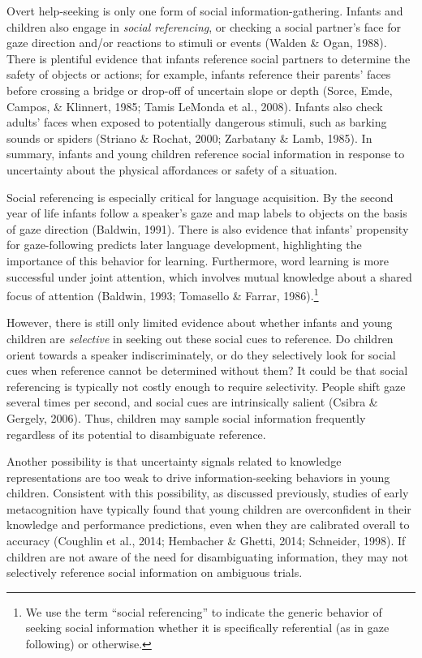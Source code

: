 \documentclass[a4paper,man,apacite,floatsintext]{apa6}
\begin{document}
Overt help-seeking is only one form of social information-gathering.
Infants and children also engage in \emph{social referencing}, or
checking a social partner's face for gaze direction and/or reactions to
stimuli or events (Walden \& Ogan, 1988). There is plentiful evidence
that infants reference social partners to determine the safety of
objects or actions; for example, infants reference their parents' faces
before crossing a bridge or drop-off of uncertain slope or depth (Sorce,
Emde, Campos, \& Klinnert, 1985; Tamis LeMonda et al., 2008). Infants
also check adults' faces when exposed to potentially dangerous stimuli,
such as barking sounds or spiders (Striano \& Rochat, 2000; Zarbatany \&
Lamb, 1985). In summary, infants and young children reference social
information in response to uncertainty about the physical affordances or
safety of a situation.

Social referencing is especially critical for language acquisition. By
the second year of life infants follow a speaker's gaze and map labels
to objects on the basis of gaze direction (Baldwin, 1991). There is also
evidence that infants' propensity for gaze-following predicts later
language development, highlighting the importance of this behavior for
learning. Furthermore, word learning is more successful under joint
attention, which involves mutual knowledge about a shared focus of
attention (Baldwin, 1993; Tomasello \& Farrar, 1986).\footnote{We use
  the term ``social referencing'' to indicate the generic behavior of
  seeking social information whether it is specifically referential (as
  in gaze following) or otherwise.}

However, there is still only limited evidence about whether infants and
young children are \emph{selective} in seeking out these social cues to
reference. Do children orient towards a speaker indiscriminately, or do
they selectively look for social cues when reference cannot be
determined without them? It could be that social referencing is
typically not costly enough to require selectivity. People shift gaze
several times per second, and social cues are intrinsically salient
(Csibra \& Gergely, 2006). Thus, children may sample social information
frequently regardless of its potential to disambiguate reference.

Another possibility is that uncertainty signals related to knowledge
representations are too weak to drive information-seeking behaviors in
young children. Consistent with this possibility, as discussed
previously, studies of early metacognition have typically found that
young children are overconfident in their knowledge and performance
predictions, even when they are calibrated overall to accuracy (Coughlin
et al., 2014; Hembacher \& Ghetti, 2014; Schneider, 1998). If children
are not aware of the need for disambiguating information, they may not
selectively reference social information on ambiguous trials.
\end{document}
